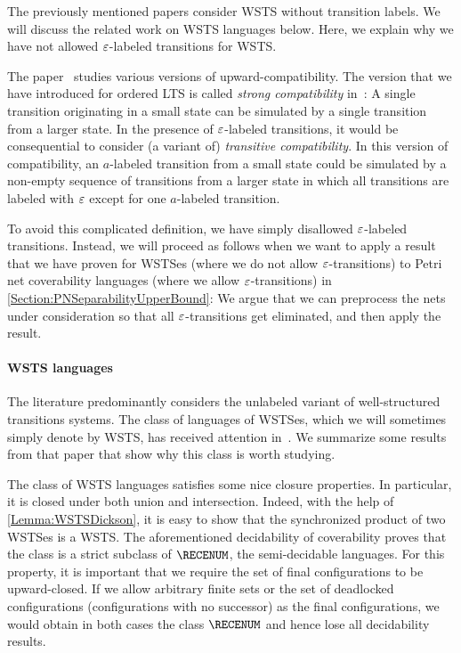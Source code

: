 \documentclass[../../diss.tex]{subfiles}
\begin{document}
\begin{remark}%
\label{Remark:WSTSEpsTransitions}%
    The previously mentioned papers consider WSTS without transition labels.
    We will discuss the related work on WSTS languages below.
    Here, we explain why we have not allowed $\varepsilon$-labeled transitions for WSTS.\@

    The paper~\cite{FinkelS01} studies various versions of upward-compatibility.
    The version that we have introduced for ordered LTS is called \emph{strong compatibility} in~\cite{FinkelS01}: A single transition originating in a small state can be simulated by a single transition from a larger state.
    In the presence of $\varepsilon$-labeled transitions, it would be consequential to consider (a variant of) \emph{transitive compatibility}.
    In this version of compatibility, an $a$-labeled transition from a small state could be simulated by a non-empty sequence of transitions from a larger state in which all transitions are labeled with $\varepsilon$ except for one $a$-labeled transition.

    To avoid this complicated definition, we have simply disallowed $\varepsilon$-labeled transitions.
    Instead, we will proceed as follows when we want to apply a result that we have proven for WSTSes (where we do not allow $\varepsilon$-transitions) to Petri net coverability languages (where we allow $\varepsilon$-transitions) in \cref{Section:PNSeparabilityUpperBound}:
    We argue that we can preprocess the nets under consideration so that all $\varepsilon$-transitions get eliminated, and then apply the result.
\end{remark}

\paragraph{WSTS languages}

The literature predominantly considers the unlabeled variant of well-structured transitions systems.
The class of languages of WSTSes, which we will sometimes simply denote by WSTS, has received attention in~\cite{GeeraertsRV07}.
We summarize some results from that paper that show why this class is worth studying.

The class of WSTS languages satisfies some nice closure properties.
In particular, it is closed under both union and intersection.
Indeed, with the help of \cref{Lemma:WSTSDickson}, it is easy to show that the synchronized product of two WSTSes is a WSTS.\@
The aforementioned decidability of coverability proves that the class is a strict subclass of $\RECENUM$, the semi-decidable languages.
For this property, it is important that we require the set of final configurations to be upward-closed.
If we allow arbitrary finite sets or the set of deadlocked configurations (configurations with no successor) as the final configurations, we would obtain in both cases the class $\RECENUM$ and hence lose all decidability results.
\end{document}
